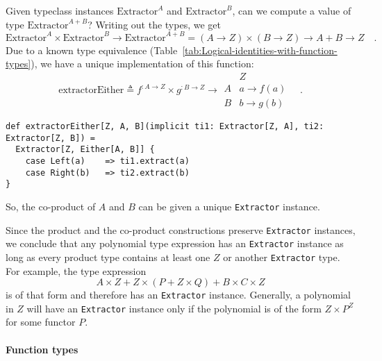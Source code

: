 Given typeclass instances $\text{Extractor}^{A}$ and $\text{Extractor}^{B}$,
can we compute a value of type $\text{Extractor}^{A+B}$? Writing
out the types, we get
\[
\text{Extractor}^{A}\times\text{Extractor}^{B}\rightarrow\text{Extractor}^{A+B}=\left(A\rightarrow Z\right)\times\left(B\rightarrow Z\right)\rightarrow A+B\rightarrow Z\quad.
\]
Due to a known type equivalence (Table~\ref{tab:Logical-identities-with-function-types}),
we have a unique implementation of this function:
\[
\text{extractorEither}\triangleq f^{:A\rightarrow Z}\times g^{:B\rightarrow Z}\rightarrow\begin{array}{|c||c|}
 & Z\\
\hline A & a\rightarrow f(a)\\
B & b\rightarrow g(b)
\end{array}\quad.
\]
\begin{lstlisting}
def extractorEither[Z, A, B](implicit ti1: Extractor[Z, A], ti2: Extractor[Z, B]) =
  Extractor[Z, Either[A, B]] {
    case Left(a)    => ti1.extract(a)
    case Right(b)   => ti2.extract(b)
}
\end{lstlisting}
So, the co-product of $A$ and $B$ can be given a unique \lstinline!Extractor!
instance.

Since the product and the co-product constructions preserve \lstinline!Extractor!
instances, we conclude that any polynomial type expression has an
\lstinline!Extractor! instance as long as every product type contains
at least one $Z$ or another \lstinline!Extractor! type. For example,
the type expression 
\[
A\times Z+Z\times(P+Z\times Q)+B\times C\times Z
\]
is of that form and therefore has an \lstinline!Extractor! instance.
Generally, a polynomial in $Z$ will have an \lstinline!Extractor!
instance only if the polynomial is of the form $Z\times P^{Z}$ for
some functor $P$.

\paragraph{Function types}

